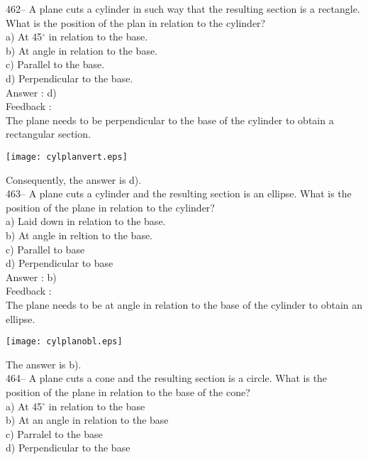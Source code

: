 \documentclass[letterpaper, 12pt]{article}
\begin{document}
462-- A plane cuts a cylinder in such way that the resulting section is a rectangle. What is the position of the plan in relation to the cylinder?\\
a) At 45$^{\circ}$ in relation to the base.\\
b) At angle in relation to the base.\\
c) Parallel to the base.\\
d) Perpendicular to the base.\\

Answer : d)\\

Feedback : \\
The plane needs to be perpendicular to the base of the cylinder to obtain a rectangular section.
    \begin{center}
    \texttt{[image: cylplanvert.eps]}
    \end{center}

Consequently, the answer is d).\\

463-- A plane cuts a cylinder and the resulting section is an ellipse. What is the position of the plane in relation to the cylinder?\\
a) Laid down in relation to the base.\\
b) At angle in reltion to the base.\\
c) Parallel to base\\
d) Perpendicular to base\\

Answer : b)\\

Feedback : \\
The plane needs to be at angle in relation to the base of the cylinder to obtain an ellipse.
    \begin{center}
    \texttt{[image: cylplanobl.eps]}
    \end{center}

The answer is b).\\


464-- A plane cuts a cone and the resulting section is a circle. What is the position of the plane in relation to the base of the cone?\\
a) At 45$^{\circ}$ in relation to the base\\
b) At an angle in relation to the base\\
c) Parralel to the base\\
d) Perpendicular to the base\\
\end{document}

